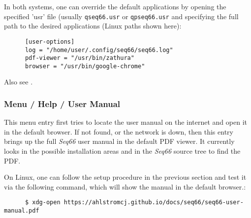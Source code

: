    In both systems, one can override the default applications by opening
   the specified 'usr' file (usually \texttt{qseq66.usr} or
   \texttt{qpseq66.usr} and specifying the full path to the desired
   applications (Linux paths shown here):

   \begin{verbatim}
      [user-options]
      log = "/home/user/.config/seq66/seq66.log"
      pdf-viewer = "/usr/bin/zathura"
      browser = "/usr/bin/google-chrome"
   \end{verbatim}

   Also see .

\subsubsection{Menu / Help / User Manual}
\label{subsubsec:menu_help_user_manual}

   This menu entry first tries to locate the user manual on the internet and
   open it in the default browser. If not found, or the network is down,
   then this entry brings up the full \textsl{Seq66} user manual in the default
   PDF viewer.  It currently looks in the possible installation areas and in
   the \textsl{Seq66} source tree to find the PDF.

   On Linux, one can follow the setup procedure in the previous section and
   test it via the following command, which will show the manual in the default
   browser.:

   \begin{verbatim}
      $ xdg-open https://ahlstromcj.github.io/docs/seq66/seq66-user-manual.pdf
   \end{verbatim}

